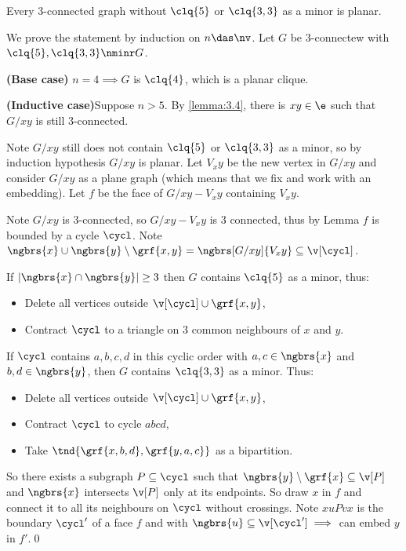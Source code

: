 \begin{customlemma}{4.16}
\label{lemma:4.16}
    Every $3$-connected graph without $\clq{5}$ or $\clq{3, 3}$ as a minor is planar.
\end{customlemma}
\begin{prf}
    We prove the statement by induction on $n \das \nv$. Let $G$ be $3$-connectew with $\clq{5}, \clq{3, 3} \nminr G$.

    \textbf{(Base case)} $n = 4 \implies G$ is $\clq{4}$, which is a planar clique. 
    
    \textbf{(Inductive case)}Suppose $n > 5$. By \ref{lemma:3.4}, there is $xy \in \e$ such that $G / xy$ is still $3$-connected. 
    
    Note $G / xy$ still does not contain $\clq{5}$ or $\clq{3, 3}$ as a minor, so by induction hypothesis $G / xy$ is planar. Let $V_xy$ be the new vertex in $G / xy$ and consider $G /xy$ as a plane graph (which means that we fix and work with an embedding). Let $f$ be the face of $G / xy - V_xy$ containing $V_xy$.

    Note $G / xy$ is $3$-connected, so $G / xy - V_xy$ is 3 connected, thus by Lemma $f$ is bounded by a cycle $\cycl$. Note $\ngbrs{x} \cup \ngbrs{y} \setminus \grf{x, y} = \ngbrs[G / xy]{V_xy} \subseteq \v[\cycl]$.

    If $|\ngbrs{x} \cap \ngbrs{y}| \geq 3$ then $G$ contains $\clq{5}$ as a minor, thus:
    \begin{itemize}
        \item Delete all vertices outside $\v[\cycl] \cup \grf{x, y}$,
        \item Contract $\cycl$ to a triangle on $3$ common neighbours of $x$ and $y$.
    \end{itemize}
    If $\cycl$ contains $a, b, c, d$ in this cyclic order with $a, c \in \ngbrs{x}$ and $b, d \in \ngbrs{y}$, then $G$ contains $\clq{3, 3}$ as a minor. Thus:
    \begin{itemize}
        \item Delete all vertices outside $\v[\cycl] \cup \grf{x, y}$,
        \item Contract $\cycl$ to cycle $abcd$,
        \item Take $\tnd{\grf{x, b, d}, \grf{y, a, c}}$ as a bipartition.
    \end{itemize}

    So there exists a subgraph $P \subseteq \cycl$ such that $\ngbrs{y} \setminus \grf{x} \subseteq \v[P]$ and $\ngbrs{x}$ intersects $\v[P]$ only at its endpoints. So draw $x$ in $f$ and connect it to all its neighbours on $\cycl$ without crossings. Note $xuPvx$ is the boundary $\cycl'$ of a face $f$ and with $\ngbrs{u} \subseteq \v[\cycl'] \implies$ can embed $y$ in $f'$.\qed
\end{prf}
